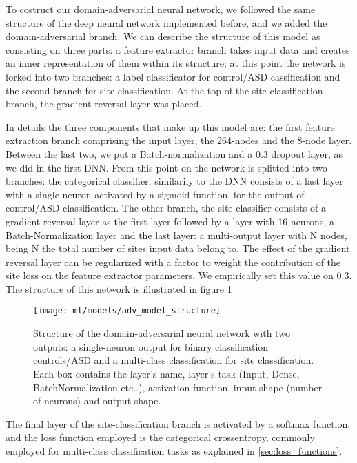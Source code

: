 \documentclass[11pt]{report}
\begin{document}
To costruct our domain-adversarial neural network, we followed the same structure of the deep neural network implemented before, and we added the domain-adversarial branch.
We can describe the structure of this model as consisting on three parts: a feature extractor branch takes input data and creates an inner representation of them within its structure; at this point the network is forked into two branches: a label classificator for control/ASD cassification and the second branch for site classification. At the top of the site-classification branch, the gradient reversal layer was placed.

In details the three components that make up this model are: the first feature extraction branch comprising the input layer, the 264-nodes and the 8-node layer. Between the last two, we put a Batch-normalization and a 0.3 dropout layer, as we did in the first DNN.
From this point on the network is splitted into two branches: the categorical classifier, similarily to the DNN consists of a last layer with a single neuron activated by a sigmoid function, for the output of control/ASD classification.
The other branch, the site classifier consists of a gradient reversal layer as the first layer followed by a layer with 16 neurons, a Batch-Normalization layer and the last layer: a multi-output layer with N nodes, being N the total number of sites input data belong to. The effect of the gradient reversal layer can be regularized with a factor to weight the contribution of the site loss on the feature extractor parameters. We empirically set this value on 0.3.
The structure of this network is illustrated in figure \ref{fig:adv_model_structure}


\begin{figure}[h!]
\centering
\texttt{[image: ml/models/adv\_model\_structure]}
\caption{Structure of the domain-adversarial neural network with two outputs: a single-neuron output for binary classification controls/ASD and a multi-class classification for site classification.
Each box contains the layer's name, layer's task (Input, Dense, BatchNormalization etc..), activation function, input shape (number of neurons) and output shape.
}
\label{fig:adv_model_structure}
\end{figure}


The final layer of the site-classification branch is activated by a softmax function, and the loss function employed is the categorical crossentropy, commonly employed for multi-class classification tasks as explained in \ref{sec:loss_functions}.
\end{document}
